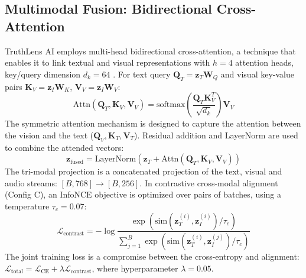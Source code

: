 \documentclass[conference]{IEEEtran}
\begin{document}
\subsection{Multimodal Fusion: Bidirectional Cross-Attention}
TruthLens AI employs multi-head bidirectional cross-attention, a technique that enables it to link textual and visual representations with $h = 4$ attention heads, key/query dimension $d_k = 64$ \cite{vaswani2017attention}. For text query $\mathbf{Q}_T = \mathbf{z}_T \mathbf{W}_Q$ and visual key-value pairs $\mathbf{K}_V = \mathbf{z}_I \mathbf{W}_K$, $\mathbf{V}_V = \mathbf{z}_I \mathbf{W}_V$:
\begin{equation}
\text{Attn}(\mathbf{Q}_T, \mathbf{K}_V, \mathbf{V}_V) = \text{softmax}\left(\frac{\mathbf{Q}_T \mathbf{K}_V^T}{\sqrt{d_k}}\right) \mathbf{V}_V
\end{equation}
The symmetric attention mechanism is designed to capture the attention between the vision and the text ($\mathbf{Q}_V, \mathbf{K}_T, \mathbf{V}_T$). Residual addition and LayerNorm are used to combine the attended vectors:
\begin{equation}
\mathbf{z}_{\text{fused}} = \text{LayerNorm}(\mathbf{z}_T + \text{Attn}(\mathbf{Q}_T, \mathbf{K}_V, \mathbf{V}_V))
\end{equation}
The tri-modal projection is a concatenated projection of the text, visual and audio streams: $[B, 768] \rightarrow [B, 256]$.
In contrastive cross-modal alignment (Config C), an InfoNCE objective is optimized over pairs of batches, using a temperature $\tau_c = 0.07$:
\begin{equation}
\mathcal{L}_{\text{contrast}} = -\log \frac{\exp(\text{sim}(\mathbf{z}_T^{(i)}, \mathbf{z}_I^{(i)}) / \tau_c)}{\sum_{j=1}^B \exp(\text{sim}(\mathbf{z}_T^{(i)}, \mathbf{z}_I^{(j)}) / \tau_c)}
\end{equation}
The joint training loss is a compromise between the cross-entropy and alignment: $\mathcal{L}_{\text{total}} = \mathcal{L}_{\text{CE}} + \lambda \mathcal{L}_{\text{contrast}}$, where hyperparameter $\lambda = 0.05$.
\end{document}
